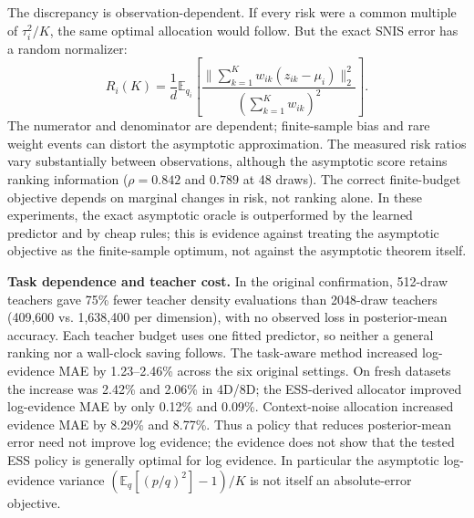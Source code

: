 \documentclass[10pt,letterpaper]{article}
\newcommand{\E}{\mathbb E}
\newcommand{\norm}[1]{\lVert #1\rVert_2}
\begin{document}
\begin{center}
\begin{minipage}{\linewidth}
\label{fig:cal}
\end{minipage}\end{center}
The discrepancy is observation-dependent. If every risk were a common multiple of $\tau_i^2/K$, the same optimal allocation would follow. But the exact SNIS error has a random normalizer:
\begin{equation}
 R_i(K)=\frac1d\E_{q_i}\left[\frac{\norm{\sum_{k=1}^{K} w_{ik}(z_{ik}-\mu_i)}^2}{(\sum_{k=1}^{K}w_{ik})^2}\right].
\end{equation}
The numerator and denominator are dependent; finite-sample bias and rare weight events can distort the asymptotic approximation. The measured risk ratios vary substantially between observations, although the asymptotic score retains ranking information ($\rho=0.842$ and $0.789$ at 48 draws). The correct finite-budget objective depends on marginal changes in risk, not ranking alone. In these experiments, the exact asymptotic oracle is outperformed by the learned predictor and by cheap rules; this is evidence against treating the asymptotic objective as the finite-sample optimum, not against the asymptotic theorem itself.

\textbf{Task dependence and teacher cost.} In the original confirmation, 512-draw teachers gave 75\% fewer teacher density evaluations than 2048-draw teachers (409,600 vs. 1,638,400 per dimension), with no observed loss in posterior-mean accuracy. Each teacher budget uses one fitted predictor, so neither a general ranking nor a wall-clock saving follows. The task-aware method increased log-evidence MAE by 1.23--2.46\% across the six original settings. On fresh datasets the increase was 2.42\% and 2.06\% in 4D/8D; the ESS-derived allocator improved log-evidence MAE by only 0.12\% and 0.09\%. Context-noise allocation increased evidence MAE by 8.29\% and 8.77\%. Thus a policy that reduces posterior-mean error need not improve log evidence; the evidence does not show that the tested ESS policy is generally optimal for log evidence. In particular the asymptotic log-evidence variance $(\E_q[(p/q)^2]-1)/K$ is not itself an absolute-error objective.
\end{document}
